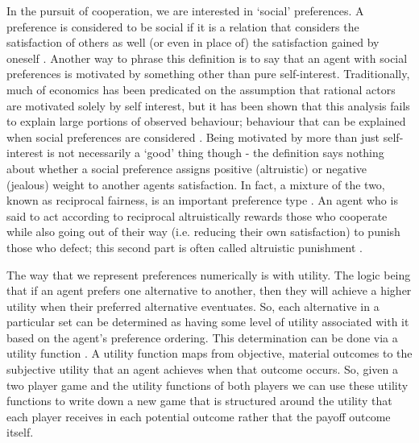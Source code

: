 \documentclass[11pt]{article}
\newcommand*{\np}{\par\noindent\newline}
\begin{document}
\np In the pursuit of cooperation, we are interested in `social' preferences. A preference is considered to be social if
it is a relation that considers the satisfaction of others as well (or even in place of) the satisfaction gained by
oneself \citep{angner_course_2012}. Another way to phrase this definition is to say that an agent with social
preferences is motivated by something other than pure self-interest. Traditionally, much of economics has been
predicated on the assumption that rational actors are motivated solely by self interest, but it has been shown that this
analysis fails to explain large portions of observed behaviour; behaviour that can be explained when social preferences
are considered \citep{fehr_why_2002}. Being motivated by more than just self-interest is not necessarily a `good' thing
though - the definition says nothing about whether a social preference assigns positive (altruistic) or negative
(jealous) weight to another agents satisfaction. In fact, a mixture of the two, known as reciprocal fairness, is an
important preference type \citep{fehr_why_2002,guth_evolutionary_1995}. An agent who is said to act according to
reciprocal altruistically rewards those who cooperate while also going out of their way (i.e. reducing their own
satisfaction) to punish those who defect; this second part is often called altruistic punishment
\citep{fehr_altruistic_2002}.

\np The way that we represent preferences numerically is with utility. The logic being that if an agent prefers one
alternative to another, then they will achieve a higher utility when their preferred alternative eventuates. So, each
alternative in a particular set can be determined as having some level of utility associated with it based on the
agent's preference ordering. This determination can be done via a utility function \citep{angner_course_2012}. A utility
function maps from objective, material outcomes to the subjective utility that an agent achieves when that outcome
occurs. So, given a two player game and the utility functions of both players we can use these utility functions
to write down a new game that is structured around the utility that each player receives in each potential outcome
rather that the payoff outcome itself.
\end{document}
